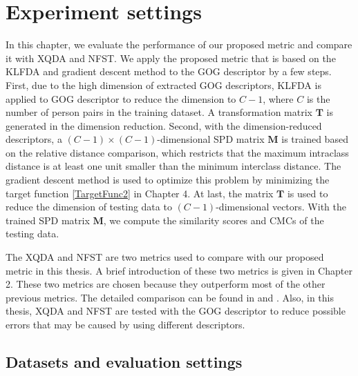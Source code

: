 \chapter{Experiment settings}
In this chapter, we evaluate the performance of our proposed metric and compare it with XQDA and NFST. We apply the proposed metric that is based on the KLFDA and gradient descent method to the GOG descriptor by a few steps. First, due to the high dimension of extracted GOG descriptors, KLFDA is applied to GOG descriptor to reduce the dimension to $C-1$, where $C$ is the number of person pairs in the training dataset. A transformation matrix $\bm{T}$ is generated in the dimension reduction. Second, with the dimension-reduced descriptors, a $(C-1) \times (C-1)$-dimensional SPD matrix $\bm{M}$ is trained based on the relative distance comparison, which restricts that the maximum intraclass distance is at least one unit smaller than the minimum interclass distance. The gradient descent method is used to optimize this problem by minimizing the target function \ref{TargetFunc2} in Chapter 4. At last, the matrix $\bm{T}$ is used to reduce the dimension of testing data to $(C-1)$-dimensional vectors. With the trained SPD matrix $\bm{M}$, we compute the similarity scores and CMCs of the testing data.
	
The XQDA and NFST are two metrics used to compare with our proposed metric in this thesis. A brief introduction of these two metrics is given in Chapter 2. These two metrics are chosen because they outperform most of the other previous metrics. The detailed comparison can be found in \cite{GOG} and \cite{NFST}. Also, in this thesis, XQDA and NFST are tested with the GOG descriptor to reduce possible errors that may be caused by using different descriptors.

\section{Datasets and evaluation settings}

